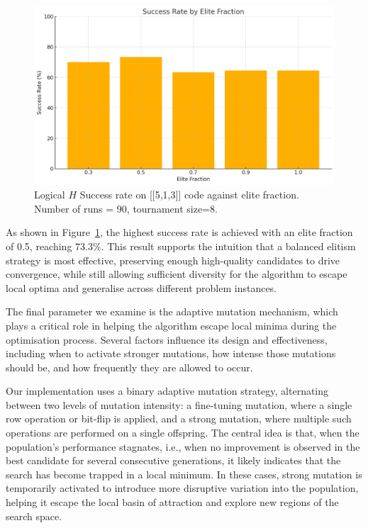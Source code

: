 \begin{figure}[h]
    \centering
    \includegraphics[width=1\linewidth]{Logos/output-3.png}
    \caption{Logical \(H\) Success rate on [[5,1,3]] code against elite fraction. Number of runs = 90, tournament size=8.}
    \label{fig: Elite fraction chart}
\end{figure}

As shown in Figure~\ref{fig: Elite fraction chart}, the highest success rate is achieved with an elite fraction of 0.5, reaching \(73.3\%\). This result supports the intuition that a balanced elitism strategy is most effective, preserving enough high-quality candidates to drive convergence, while still allowing sufficient diversity for the algorithm to escape local optima and generalise across different problem instances.

The final parameter we examine is the adaptive mutation mechanism, which plays a critical role in helping the algorithm escape local minima during the optimisation process. Several factors influence its design and effectiveness, including when to activate stronger mutations, how intense those mutations should be, and how frequently they are allowed to occur.

Our implementation uses a binary adaptive mutation strategy, alternating between two levels of mutation intensity: a fine-tuning mutation, where a single row operation or bit-flip is applied, and a strong mutation, where multiple such operations are performed on a single offspring. The central idea is that, when the population's performance stagnates, i.e., when no improvement is observed in the best candidate for several consecutive generations, it likely indicates that the search has become trapped in a local minimum. In these cases, strong mutation is temporarily activated to introduce more disruptive variation into the population, helping it escape the local basin of attraction and explore new regions of the search space.

